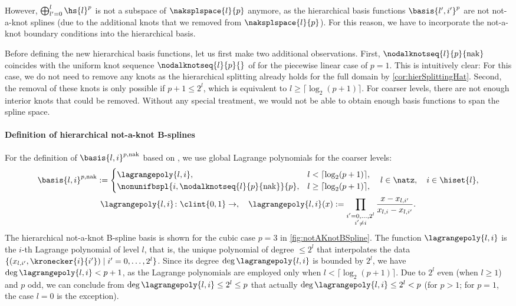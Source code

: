 However, $\bigoplus_{l'=0}^l \hs{l}^p$ is not a subspace of
$\naksplspace{l}{p}$ anymore,
as the hierarchical basis functions $\basis{l',i'}^p$ are not
not-a-knot splines (due to the additional knots that we removed from
$\naksplspace{l}{p}$).
For this reason,
we have to incorporate the not-a-knot boundary conditions into the
hierarchical basis.

Before defining the new hierarchical basis functions,
let us first make two additional observations.
First, $\nodalknotseq{l}{p}{\notaknot}$ coincides with the
uniform knot sequence $\nodalknotseq{l}{p}{}$ of 
for the piecewise linear case of $p = 1$.
This is intuitively clear:
For this case,
we do not need to remove any knots as the hierarchical splitting already
holds for the full domain by \cref{cor:hierSplittingHat}.
Second, the removal of these knots is only possible if $p + 1 \le 2^l$,
which is equivalent to $l \ge \lceil\log_2(p+1)\rceil$.
For coarser levels,
there are not enough interior knots that could be removed.
Without any special treatment,
we would not be able to obtain enough basis functions to span the spline space.

\paragraph{Definition of hierarchical not-a-knot B-splines}

For the definition of 
$\basis{l,i}^{p,\notaknot}$ based on ,
we use global Lagrange polynomials for the coarser levels:
\begin{subequations}
  \begin{gather}
    \basis{l,i}^{p,\notaknot}
    :=
    \begin{cases}
      \lagrangepoly{l,i},&
      l < \lceil\log_2(p+1)\rceil,\\
      \nonunifbspl{i,\nodalknotseq{l}{p}{\notaknot}}{p},&
      l \ge \lceil\log_2(p+1)\rceil,
    \end{cases}\quad
    l \in \natz,\quad
    i \in \hiset{l},\\
    \lagrangepoly{l,i}\colon \clint{0, 1} \to \real,\quad
    \lagrangepoly{l,i}(x)
    := \prod_{\substack{i'=0,\dotsc,2^l\\i'\not=i}}
    \frac{x - \gp{l,i'}}{\gp{l,i} - \gp{l,i'}}.
  \end{gather}
\end{subequations}
The hierarchical not-a-knot B-spline basis is shown for the
cubic case $p = 3$ in \cref{fig:notAKnotBSpline}.
The function $\lagrangepoly{l,i}$ is the $i$-th Lagrange polynomial of level $l$,
that is,
the unique polynomial of degree $\le 2^l$ that interpolates the data
$\{(\gp{l,i'}, \kronecker{i}{i'}) \mid i' = 0, \dotsc, 2^l\}$.
Since its degree $\deg \lagrangepoly{l,i}$ is bounded by $2^l$,
we have $\deg \lagrangepoly{l,i} < p + 1$,
as the Lagrange polynomials are employed only when
$l < \lceil\log_2(p+1)\rceil$.
Due to $2^l$ even (when $l \ge 1$) and $p$ odd,
we can conclude from $\deg \lagrangepoly{l,i} \le 2^l \le p$ that actually
$\deg \lagrangepoly{l,i} \le 2^l < p$
(for $p > 1$; for $p = 1$, the case $l = 0$ is the exception).


